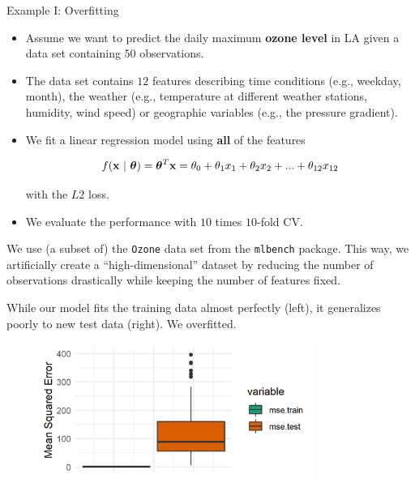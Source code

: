 \documentclass[11pt,compress,t,notes=noshow, xcolor=table]{beamer}
\begin{document}
\begin{vbframe}{Example I: Overfitting}

\begin{itemize}
\item Assume we want to predict the daily maximum \textbf{ozone level} in LA given a data set containing $50$ observations.
\item The data set contains $12$ features describing time conditions (e.g., weekday, month),
the weather (e.g., temperature at different weather stations, humidity, wind speed) or geographic variables (e.g., the pressure gradient).
\item We fit a linear regression model using \textbf{all} of the features

$$
f(\mathbf{x} ~|~ \bm{\theta}) = \bm{\theta}^T\mathbf{x} = \theta_0 + \theta_1 x_1 + \theta_2 x_2 + ... + \theta_{12} x_{12}
$$

with the $L2$ loss.

\item We evaluate the performance with $10$ times $10$-fold CV.

\end{itemize}

\vfill

\begin{footnotesize} 
We use (a subset of) the \texttt{Ozone} data set from the \texttt{mlbench} package. This way, we artificially create a \enquote{high-dimensional} dataset by reducing the number of observations drastically while keeping the number of features fixed. 
\end{footnotesize}

\framebreak 


While our model fits the training data almost perfectly (left), it generalizes poorly
to new test data (right). We overfitted.

\lz 

\begin{figure}
\includegraphics[width=0.8\textwidth]{figure/ozone_mse_boxplot.png}\\
\end{figure}

\end{vbframe}
\end{document}
